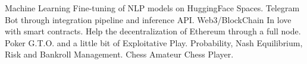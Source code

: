 \begin{cvskills}
  \cvskill
  {Machine Learning}
  {Fine-tuning of NLP models on HuggingFace Spaces. Telegram Bot through integration pipeline and inference API.}
  \cvskill
    {Web3/BlockChain} %
    {In love with smart contracts.
    Help the decentralization of Ethereum through a full node.} %
  \cvskill
    {Poker} %
    {G.T.O. and a little bit of Exploitative Play. Probability, Nash Equilibrium, Risk and Bankroll Management.} %
  \cvskill
    {Chess} %
    {Amateur Chess Player.} %
\end{cvskills}